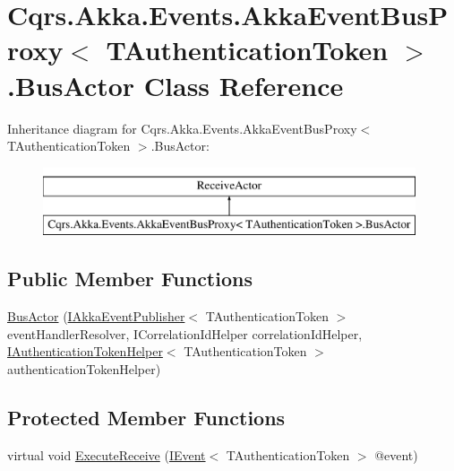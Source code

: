 \hypertarget{classCqrs_1_1Akka_1_1Events_1_1AkkaEventBusProxy_1_1BusActor}{}\section{Cqrs.\+Akka.\+Events.\+Akka\+Event\+Bus\+Proxy$<$ T\+Authentication\+Token $>$.Bus\+Actor Class Reference}
\label{classCqrs_1_1Akka_1_1Events_1_1AkkaEventBusProxy_1_1BusActor}
Inheritance diagram for Cqrs.\+Akka.\+Events.\+Akka\+Event\+Bus\+Proxy$<$ T\+Authentication\+Token $>$.Bus\+Actor\+:\begin{figure}[H]
\begin{center}
\leavevmode
\includegraphics[height=2.000000cm]{classCqrs_1_1Akka_1_1Events_1_1AkkaEventBusProxy_1_1BusActor}
\end{center}
\end{figure}
\subsection*{Public Member Functions}
\begin{DoxyCompactItemize}
\item 
\hyperlink{classCqrs_1_1Akka_1_1Events_1_1AkkaEventBusProxy_1_1BusActor_aeb7cebaad75d810375d0adb82848974a}{Bus\+Actor} (\hyperlink{interfaceCqrs_1_1Akka_1_1Events_1_1IAkkaEventPublisher}{I\+Akka\+Event\+Publisher}$<$ T\+Authentication\+Token $>$ event\+Handler\+Resolver, I\+Correlation\+Id\+Helper correlation\+Id\+Helper, \hyperlink{interfaceCqrs_1_1Authentication_1_1IAuthenticationTokenHelper}{I\+Authentication\+Token\+Helper}$<$ T\+Authentication\+Token $>$ authentication\+Token\+Helper)
\end{DoxyCompactItemize}
\subsection*{Protected Member Functions}
\begin{DoxyCompactItemize}
\item 
virtual void \hyperlink{classCqrs_1_1Akka_1_1Events_1_1AkkaEventBusProxy_1_1BusActor_a90a6f4b440d2e2d9b997f6280ce67921}{Execute\+Receive} (\hyperlink{interfaceCqrs_1_1Events_1_1IEvent}{I\+Event}$<$ T\+Authentication\+Token $>$ @event)
\end{DoxyCompactItemize}
